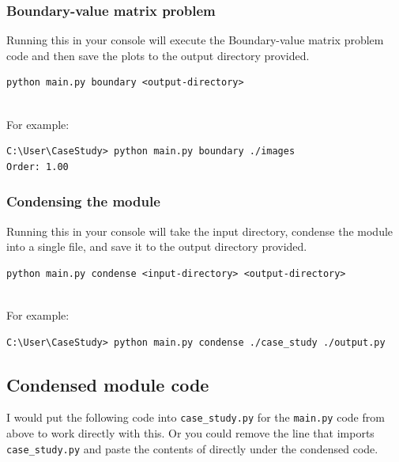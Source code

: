 \documentclass[../main.tex]{subfiles}
\begin{document}
    \subsubsection{Boundary-value matrix problem}\label{subsubsec:bvp-appendix}
    Running this in your console will execute the Boundary-value matrix problem code and
    then save the plots to the output directory provided.
    \begin{lstlisting}[style=console,label={lst:appendix-bvp-usage}]
python main.py boundary <output-directory>
    \end{lstlisting}
    \\
    For example:
    \begin{lstlisting}[style=console,label={lst:appendix-bvp-example}]
C:\User\CaseStudy> python main.py boundary ./images
Order: 1.00
    \end{lstlisting}

    \subsubsection{Condensing the module}
    Running this in your console will take the input directory, condense the module into a single file,
    and save it to the output directory provided.
    \begin{lstlisting}[style=console,label={lst:appendix-condensing-module-usage}]
python main.py condense <input-directory> <output-directory>
    \end{lstlisting}
    \\
    For example:
    \begin{lstlisting}[style=console,label={lst:appendix-condensing-module-example}]
C:\User\CaseStudy> python main.py condense ./case_study ./output.py
    \end{lstlisting}

    \subsection*{Condensed module code}\label{subsec:condensed-code}
    I would put the following code into \texttt{case\_study.py} for the \texttt{main.py} code from above to work
    directly with this.
    Or you could remove the line that imports \texttt{case\_study.py} and paste the contents of
     directly under the condensed code.
    
\end{document}
